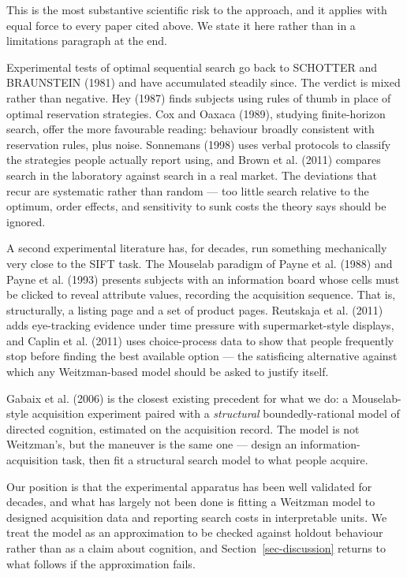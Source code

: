 \documentclass[
  letterpaper,
  DIV=11,
  numbers=noendperiod]{scrartcl}
\begin{document}
This is the most substantive scientific risk to the approach, and it
applies with equal force to every paper cited above. We state it here
rather than in a limitations paragraph at the end.

Experimental tests of optimal sequential search go back to SCHOTTER and
BRAUNSTEIN (1981) and have accumulated steadily since. The verdict is
mixed rather than negative. Hey (1987) finds subjects using rules of
thumb in place of optimal reservation strategies. Cox and Oaxaca (1989),
studying finite-horizon search, offer the more favourable reading:
behaviour broadly consistent with reservation rules, plus noise.
Sonnemans (1998) uses verbal protocols to classify the strategies people
actually report using, and Brown et al. (2011) compares search in the
laboratory against search in a real market. The deviations that recur
are systematic rather than random --- too little search relative to the
optimum, order effects, and sensitivity to sunk costs the theory says
should be ignored.

A second experimental literature has, for decades, run something
mechanically very close to the SIFT task. The Mouselab paradigm of Payne
et al. (1988) and Payne et al. (1993) presents subjects with an
information board whose cells must be clicked to reveal attribute
values, recording the acquisition sequence. That is, structurally, a
listing page and a set of product pages. Reutskaja et al. (2011) adds
eye-tracking evidence under time pressure with supermarket-style
displays, and Caplin et al. (2011) uses choice-process data to show that
people frequently stop before finding the best available option --- the
satisficing alternative against which any Weitzman-based model should be
asked to justify itself.

Gabaix et al. (2006) is the closest existing precedent for what we do: a
Mouselab-style acquisition experiment paired with a \emph{structural}
boundedly-rational model of directed cognition, estimated on the
acquisition record. The model is not Weitzman's, but the maneuver is the
same one --- design an information-acquisition task, then fit a
structural search model to what people acquire.

Our position is that the experimental apparatus has been well validated
for decades, and what has largely not been done is fitting a Weitzman
model to designed acquisition data and reporting search costs in
interpretable units. We treat the model as an approximation to be
checked against holdout behaviour rather than as a claim about
cognition, and Section~\ref{sec-discussion} returns to what follows if
the approximation fails.
\end{document}
